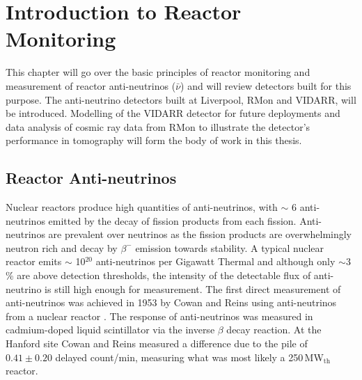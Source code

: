 
\ifpdf
    \graphicspath{{Chapter1/Figs/Raster/}{Chapter1/Figs/PDF/}{Chapter1/Figs/}}
\else
    \graphicspath{{Chapter1/Figs/Vector/}{Chapter1/Figs/}}
\fi

\chapter{Introduction to Reactor Monitoring} \label{Chap:theAimOfVidarr} %
This chapter will go over the basic principles of reactor monitoring and measurement of reactor anti-neutrinos ($\bar{\nu}$) and will review detectors built for this purpose. The anti-neutrino detectors built at Liverpool, RMon and VIDARR, will be introduced. Modelling of the VIDARR detector for future deployments and data analysis of cosmic ray data from RMon to illustrate the detector's performance in tomography will form the body of work in this thesis.

\section{Reactor Anti-neutrinos}
Nuclear reactors produce high quantities of anti-neutrinos, with $\sim$ 6 anti-neutrinos emitted by the decay of fission products from each fission. Anti-neutrinos are prevalent over neutrinos as the fission products are overwhelmingly neutron rich and decay by $\beta^-$ emission towards stability. A typical nuclear reactor emits $\sim$ 10$^{20}$ anti-neutrinos per Gigawatt Thermal and although only $\sim$3\,\% are above detection thresholds, the intensity of the detectable flux of anti-neutrino is still high enough for measurement. The first direct measurement of anti-neutrinos was achieved in 1953 by Cowan and Reins using anti-neutrinos from a nuclear reactor \cite{reines1953detection}. The response of anti-neutrinos was measured in cadmium-doped liquid scintillator \cite{reines1953proposed} via the inverse $\beta$ decay reaction. At the Hanford site Cowan and Reins measured a difference due to the pile of $0.41 \pm 0.20$ delayed count/min\cite{reines1953detection}, measuring what was most likely a 250\,MW$_{\textrm{th}}$ reactor.

